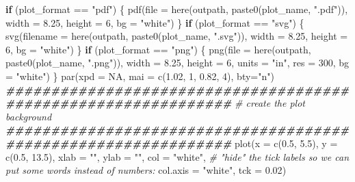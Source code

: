 \documentclass[
  11pt,
]{article}
\newenvironment{Shaded}{\begin{snugshade}}{\end{snugshade}}
\newcommand{\AttributeTok}[1]{\textcolor[rgb]{0.77,0.63,0.00}{#1}}
\newcommand{\CommentTok}[1]{\textcolor[rgb]{0.56,0.35,0.01}{\textit{#1}}}
\newcommand{\ConstantTok}[1]{\textcolor[rgb]{0.00,0.00,0.00}{#1}}
\newcommand{\ControlFlowTok}[1]{\textcolor[rgb]{0.13,0.29,0.53}{\textbf{#1}}}
\newcommand{\DecValTok}[1]{\textcolor[rgb]{0.00,0.00,0.81}{#1}}
\newcommand{\DocumentationTok}[1]{\textcolor[rgb]{0.56,0.35,0.01}{\textbf{\textit{#1}}}}
\newcommand{\FloatTok}[1]{\textcolor[rgb]{0.00,0.00,0.81}{#1}}
\newcommand{\FunctionTok}[1]{\textcolor[rgb]{0.00,0.00,0.00}{#1}}
\newcommand{\NormalTok}[1]{#1}
\newcommand{\SpecialCharTok}[1]{\textcolor[rgb]{0.00,0.00,0.00}{#1}}
\newcommand{\StringTok}[1]{\textcolor[rgb]{0.31,0.60,0.02}{#1}}
\begin{document}
\begin{Shaded}
\begin{Highlighting}[]
\ControlFlowTok{if}\NormalTok{ (plot\_format }\SpecialCharTok{==} \StringTok{"pdf"}\NormalTok{) \{}
  \FunctionTok{pdf}\NormalTok{(}\AttributeTok{file =} \FunctionTok{here}\NormalTok{(outpath, }\FunctionTok{paste0}\NormalTok{(plot\_name, }\StringTok{".pdf"}\NormalTok{)),}
      \AttributeTok{width =} \FloatTok{8.25}\NormalTok{,}
      \AttributeTok{height =} \DecValTok{6}\NormalTok{,}
      \AttributeTok{bg =} \StringTok{"white"}\NormalTok{)  }
\NormalTok{\}}
\ControlFlowTok{if}\NormalTok{ (plot\_format }\SpecialCharTok{==} \StringTok{"svg"}\NormalTok{) \{}
  \FunctionTok{svg}\NormalTok{(}\AttributeTok{filename =} \FunctionTok{here}\NormalTok{(outpath, }\FunctionTok{paste0}\NormalTok{(plot\_name, }\StringTok{".svg"}\NormalTok{)),}
      \AttributeTok{width =} \FloatTok{8.25}\NormalTok{,}
      \AttributeTok{height =} \DecValTok{6}\NormalTok{,}
      \AttributeTok{bg =} \StringTok{"white"}\NormalTok{)  }
\NormalTok{\}}
\ControlFlowTok{if}\NormalTok{ (plot\_format }\SpecialCharTok{==} \StringTok{"png"}\NormalTok{) \{}
  \FunctionTok{png}\NormalTok{(}\AttributeTok{file =} \FunctionTok{here}\NormalTok{(outpath, }\FunctionTok{paste0}\NormalTok{(plot\_name, }\StringTok{".png"}\NormalTok{)),}
      \AttributeTok{width =} \FloatTok{8.25}\NormalTok{,}
      \AttributeTok{height =} \DecValTok{6}\NormalTok{,}
      \AttributeTok{units =} \StringTok{"in"}\NormalTok{,}
      \AttributeTok{res =} \DecValTok{300}\NormalTok{,}
      \AttributeTok{bg =} \StringTok{"white"}\NormalTok{)  }
\NormalTok{\}}
\FunctionTok{par}\NormalTok{(}\AttributeTok{xpd =} \ConstantTok{NA}\NormalTok{,}
    \AttributeTok{mai =} \FunctionTok{c}\NormalTok{(}\FloatTok{1.02}\NormalTok{, }\DecValTok{1}\NormalTok{, }\FloatTok{0.82}\NormalTok{, }\DecValTok{4}\NormalTok{),}
    \AttributeTok{bty=}\StringTok{"n"}\NormalTok{)}
\DocumentationTok{\#\#\#\#\#\#\#\#\#\#\#\#\#\#\#\#\#\#\#\#\#\#\#\#\#\#\#\#\#\#\#\#\#\#\#\#\#\#\#\#\#\#\#\#\#\#\#\#\#\#\#\#\#\#\#\#\#\#\#\#\#\#\#}
\CommentTok{\# create the plot background}
\DocumentationTok{\#\#\#\#\#\#\#\#\#\#\#\#\#\#\#\#\#\#\#\#\#\#\#\#\#\#\#\#\#\#\#\#\#\#\#\#\#\#\#\#\#\#\#\#\#\#\#\#\#\#\#\#\#\#\#\#\#\#\#\#\#\#\#}
\FunctionTok{plot}\NormalTok{(}\AttributeTok{x =} \FunctionTok{c}\NormalTok{(}\FloatTok{0.5}\NormalTok{, }\FloatTok{5.5}\NormalTok{),}
     \AttributeTok{y =} \FunctionTok{c}\NormalTok{(}\FloatTok{0.5}\NormalTok{, }\FloatTok{13.5}\NormalTok{),}
     \AttributeTok{xlab =} \StringTok{""}\NormalTok{,}
     \AttributeTok{ylab =} \StringTok{""}\NormalTok{,}
     \AttributeTok{col =} \StringTok{"white"}\NormalTok{,}
     \CommentTok{\# "hide" the tick labels so we can put some words instead of numbers:}
     \AttributeTok{col.axis =} \StringTok{"white"}\NormalTok{,}
     \AttributeTok{tck =} \FloatTok{0.02}\NormalTok{)}


\end{Highlighting}
\end{Shaded}
\end{document}
